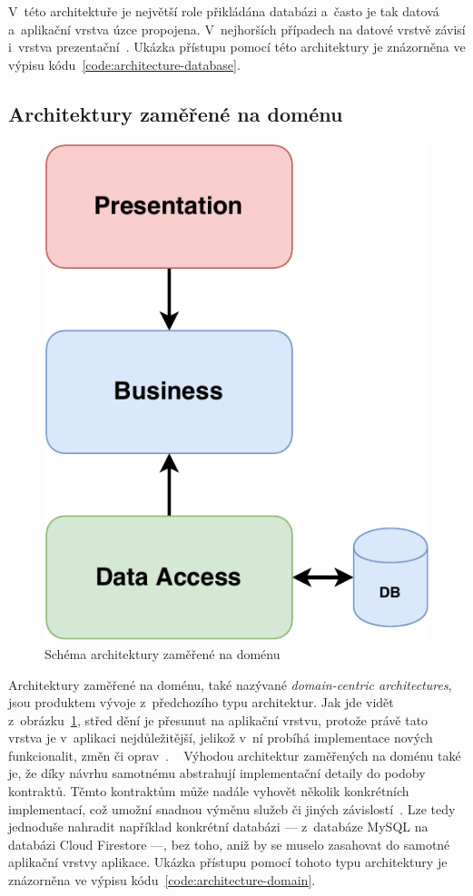 V~této architektuře je největší role přikládána databázi
a~často je tak datová a~aplikační vrstva úzce propojena.
V~nejhorších případech na datové vrstvě závisí
i~vrstva prezentační~\cite{architecture}.
Ukázka přístupu pomocí této architektury je znázorněna ve výpisu
kódu~\ref{code:architecture-database}.

\subsection{Architektury zaměřené na doménu}

\begin{figure}
    \centering
    \includegraphics[width=0.35\linewidth]{assets/technology-research/architecture/domain-centric.pdf}
    \caption{Schéma architektury zaměřené na doménu~\cite{architecture}}
    \label{fig:architecture_domain}
\end{figure}

Architektury zaměřené na doménu,
také nazývané \emph{domain-centric architectures},
jsou produktem vývoje z~předchozího typu architektur.
Jak jde vidět z~obrázku~\ref{fig:architecture_domain},
střed dění je přesunut na aplikační vrstvu,
protože právě tato vrstva je v~aplikaci nejdůležitější,
jelikož v~ní probíhá implementace nových funkcionalit,
změn či oprav~\cite{architecture}.
\emph{}~\cite[str.~140]{martin_clean_architecture}
Výhodou architektur zaměřených na doménu také je,
že díky návrhu samotnému abstrahují implementační detaily do podoby kontraktů.
Těmto kontraktům může nadále vyhovět několik konkrétních implementací,
což umožní snadnou výměnu služeb
či jiných závislostí~\cite[str.~135--146]{martin_clean_architecture}.
Lze tedy jednoduše nahradit například konkrétní databázi
--- z~databáze MySQL na databázi Cloud Firestore ---,
bez toho,
aniž by se muselo zasahovat do samotné aplikační vrstvy aplikace.
Ukázka přístupu pomocí tohoto typu architektury je znázorněna
ve výpisu kódu~\ref{code:architecture-domain}.

